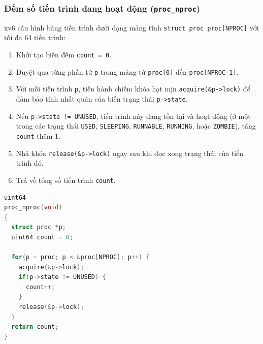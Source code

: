\subsubsection{Đếm số tiến trình đang hoạt động (\texttt{proc\_nproc})}
xv6 cấu hình bảng tiến trình dưới dạng mảng tĩnh \texttt{struct proc proc[NPROC]} với tối đa 64 tiến trình:
\begin{enumerate}
    \item Khởi tạo biến đếm \texttt{count = 0}.
    \item Duyệt qua từng phần tử \texttt{p} trong mảng từ \texttt{proc[0]} đến \texttt{proc[NPROC-1]}.
    \item Với mỗi tiến trình \texttt{p}, tiến hành chiếm khóa hạt mịn \texttt{acquire(\&p->lock)} để đảm bảo tính nhất quán của biến trạng thái \texttt{p->state}.
    \item Nếu \texttt{p->state != UNUSED}, tiến trình này đang tồn tại và hoạt động (ở một trong các trạng thái \texttt{USED}, \texttt{SLEEPING}, \texttt{RUNNABLE}, \texttt{RUNNING}, hoặc \texttt{ZOMBIE}), tăng \texttt{count} thêm 1.
    \item Nhả khóa \texttt{release(\&p->lock)} ngay sau khi đọc xong trạng thái của tiến trình đó.
    \item Trả về tổng số tiến trình \texttt{count}.
\end{enumerate}

\begin{lstlisting}[language=C, caption={Cài đặt hàm đếm tiến trình trong kernel/proc.c}]
uint64
proc_nproc(void)
{
  struct proc *p;
  uint64 count = 0;

  for(p = proc; p < &proc[NPROC]; p++) {
    acquire(&p->lock);
    if(p->state != UNUSED) {
      count++;
    }
    release(&p->lock);
  }
  return count;
}
\end{lstlisting}

